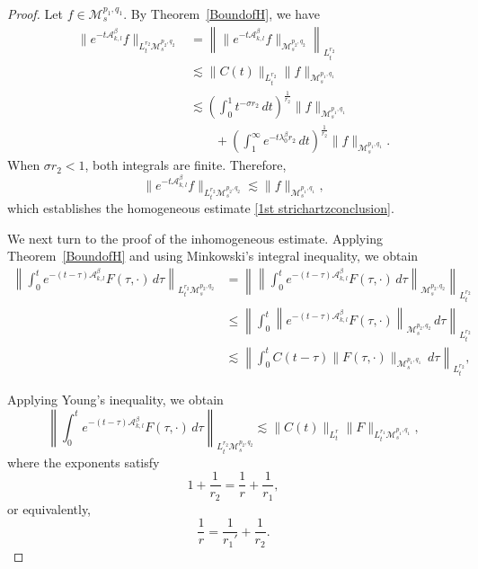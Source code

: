 \documentclass[12pt,reqno,a4paper]{amsart}
\numberwithin{equation}{section}
\theoremstyle{plain}
\theoremstyle{definition}
\theoremstyle{remark}
\def\M{\mathcal{M}}
\def \Ad{\mathcal{A}_{k,l}}
\def \M{{\mathcal M}}
\begin{document}
\begin{proof}
Let \(f\in \M^{p_{1},q_{1}}_{s}\). By Theorem~\ref{BoundofH}, we have
\begin{align*}
\|e^{-t\Ad^{\beta}}f\|_{L^{r_{2}}_{t}\M^{p_{2},q_{2}}_{s}}
&=
\left\|
\|e^{-t\Ad^{\beta}}f\|_{\M^{p_{2},q_{2}}_{s}}
\right\|_{L^{r_{2}}_{t}}
\\
&\lesssim
\|C(t)\|_{L^{r_{2}}_{t}}
\|f\|_{\M^{p_{1},q_{1}}_{s}}
\\
&\lesssim
\left(
\int_{0}^{1}
t^{-\sigma r_{2}}\,dt
\right)^{\frac1{r_{2}}}
\|f\|_{\M^{p_{1},q_{1}}_{s}}
\\
&\qquad
+
\left(
\int_{1}^{\infty}
e^{-t\lambda_{0}^{\beta}r_{2}}\,dt
\right)^{\frac1{r_{2}}}
\|f\|_{\M^{p_{1},q_{1}}_{s}}.
\end{align*}
When \(\sigma r_{2}<1\), both integrals are finite. Therefore,
\[
\|e^{-t\Ad^{\beta}}f\|_{L^{r_{2}}_{t}\M^{p_{2},q_{2}}_{s}}
\lesssim
\|f\|_{\M^{p_{1},q_{1}}_{s}},
\]
which establishes the homogeneous estimate \eqref{1st strichartzconclusion}.

We next turn to the proof of the inhomogeneous estimate. Applying Theorem~\ref{BoundofH} and using Minkowski's integral inequality, we obtain
\begin{align*}
\left\|
\int_{0}^{t}
e^{-(t-\tau)\Ad^{\beta}}
F(\tau,\cdot)\,d\tau
\right\|_{L^{r_{2}}_{t}\M^{p_{2},q_{2}}_{s}}
&=
\left\|
\left\|
\int_{0}^{t}
e^{-(t-\tau)\Ad^{\beta}}
F(\tau,\cdot)\,d\tau
\right\|_{\M^{p_{2},q_{2}}_{s}}
\right\|_{L^{r_{2}}_{t}}
\\
&\le
\left\|
\int_{0}^{t}
\left\|
e^{-(t-\tau)\Ad^{\beta}}
F(\tau,\cdot)
\right\|_{\M^{p_{2},q_{2}}_{s}}
\,d\tau
\right\|_{L^{r_{2}}_{t}}
\\
&\lesssim
\left\|
\int_{0}^{t}
C(t-\tau)
\|F(\tau,\cdot)\|_{\M^{p_{1},q_{1}}_{s}}
\,d\tau
\right\|_{L^{r_{2}}_{t}},
\end{align*}

Applying Young's inequality, we obtain
\begin{equation}
\label{1stenq}
\left\|
\int_{0}^{t}
e^{-(t-\tau)\Ad^{\beta}}
F(\tau,\cdot)\,d\tau
\right\|_{L^{r_{2}}_{t}\M^{p_{2},q_{2}}_{s}}
\lesssim
\|C(t)\|_{L^{r}_{t}}
\|F\|_{L^{r_{1}}_{t}\M^{p_{1},q_{1}}_{s}},
\end{equation}
where the exponents satisfy
\[
1+\frac{1}{r_{2}}
=
\frac{1}{r}
+
\frac{1}{r_{1}},
\]
or equivalently,
\begin{equation}
\label{enqr}
\frac{1}{r}
=
\frac{1}{r_{1}'}
+
\frac{1}{r_{2}}.
\end{equation}


\end{proof}
\end{document}
